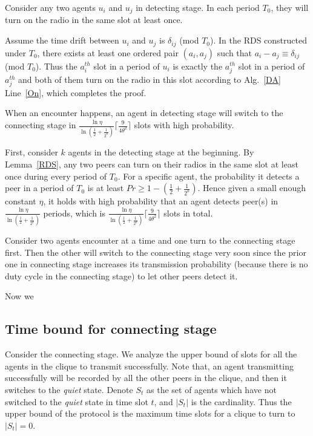 \begin{lemma}
    \label{RDS}
    Consider any two agents $u_i$ and $u_j$ in detecting stage.
    In each period $T_0$, they will turn on the radio in the same slot at least once.
\end{lemma}
\begin{IEEEproof}
Assume the time drift between $u_i$ and $u_j$ is $\delta_{ij}$ (mod $T_0$).
In the RDS constructed under $T_0$, there exists at least one ordered pair $(a_i,a_j)$ such that $a_i - a_j \equiv \delta_{ij}$ (mod $T_0$).
Thus the $a_i^{th}$ slot in a period of $u_i$ is exactly the $a_j^{th}$ slot in a period of $a_j^{th}$ and both of them
turn on the radio in this slot according to Alg.~\ref{DA} Line~\ref{On}, which completes the proof.
\end{IEEEproof}
\begin{lemma}
    When an encounter happens, an agent in detecting stage will switch to the connecting stage in 
    $\frac{\ln\eta}{\ln(\frac{1}{2}+\frac{1}{2^k})} \lceil \frac{9}{4\theta^{2}} \rceil$
    slots with high probability.
\end{lemma}
\begin{IEEEproof}
    First, consider $k$ agents in the detecting stage at the beginning. 
    By Lemma~\ref{RDS}, any two peers can turn on their radios in the same 
    slot at least once during every period of $T_0$. 
    For a specific agent,
    the probability it detects a peer in a period of $T_0$ is at least
    $Pr \geq 1 - (\frac{1}{2} +\frac{1}{2^k})$.
    Hence given a small enough constant $\eta$,  
    it holds with high probability that an agent detects peer(s) in 
    $\frac{\ln\eta}{\ln(\frac{1}{2}+\frac{1}{2^k})}$ periods, which is 
    $\frac{\ln\eta}{\ln(\frac{1}{2}+\frac{1}{2^k})} \lceil \frac{9}{4\theta^{2}} \rceil$ slots
    in total.    


    Consider two agents encounter at a time and one turn to the connecting stage first.
    Then the other will switch to the connecting stage very soon since the prior one in connecting
    stage increases its transmission probability (because there is no duty cycle in the 
    connecting stage) to let other peers detect it. 

    Now we 
\end{IEEEproof}


\subsection{Time bound for connecting stage}
\label{boundPC}
Consider the connecting stage.
We analyze the upper bound of slots
for all the agents in the clique to transmit successfully.
Note that, an agent transmitting successfully will be recorded by 
all the other peers in the clique, and then it switches to the \emph{quiet} state. 
Denote $S_t$ as the set of agents
which have not switched to the \emph{quiet} state in time slot $t$, and 
$|S_t|$ is the cardinality. 
Thus the upper bound of the protocol is the maximum time slots
for a clique to turn to $|S_t| = 0$.

